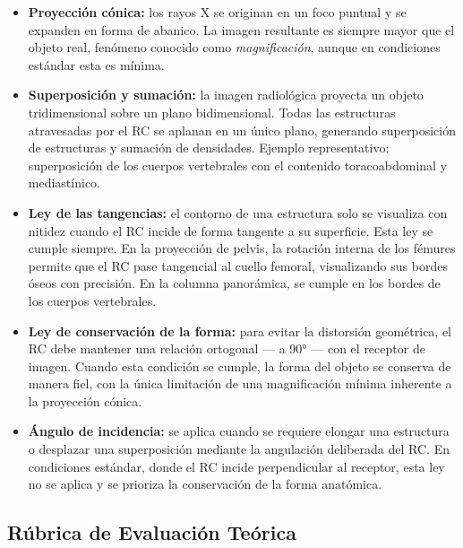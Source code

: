 	\begin{itemize}
		\item \textbf{Proyección cónica:} los rayos X se originan en un foco puntual
		y se expanden en forma de abanico. La imagen resultante es siempre mayor que
		el objeto real, fenómeno conocido como \textit{magnificación}, aunque en
		condiciones estándar esta es mínima.
		
		\item \textbf{Superposición y sumación:} la imagen radiológica proyecta un
		objeto tridimensional sobre un plano bidimensional. Todas las estructuras
		atravesadas por el RC se aplanan en un único plano, generando superposición
		de estructuras y sumación de densidades. Ejemplo representativo: superposición
		de los cuerpos vertebrales con el contenido toracoabdominal y mediastínico.
		
		\item \textbf{Ley de las tangencias:} el contorno de una estructura solo se
		visualiza con nitidez cuando el RC incide de forma tangente a su superficie.
		Esta ley se cumple siempre. En la proyección de pelvis, la rotación interna
		de los fémures permite que el RC pase tangencial al cuello femoral,
		visualizando sus bordes óseos con precisión. En la columna panorámica, se
		cumple en los bordes de los cuerpos vertebrales.
		
		\item \textbf{Ley de conservación de la forma:} para evitar la distorsión
		geométrica, el RC debe mantener una relación ortogonal --- a 90° --- con el
		receptor de imagen. Cuando esta condición se cumple, la forma del objeto se
		conserva de manera fiel, con la única limitación de una magnificación mínima
		inherente a la proyección cónica.
		
		\item \textbf{Ángulo de incidencia:} se aplica cuando se requiere elongar una
		estructura o desplazar una superposición mediante la angulación deliberada del
		RC. En condiciones estándar, donde el RC incide perpendicular al receptor, esta
		ley no se aplica y se prioriza la conservación de la forma anatómica.
	\end{itemize}
	
	\clearpage
	
	\subsection{Rúbrica de Evaluación Teórica}
	
